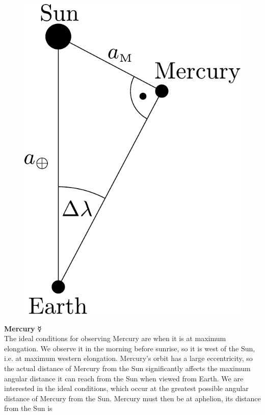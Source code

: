 \documentclass[a4paper,12pt]{extarticle}
\begin{document}
\begin{sol}	
	\begin{figure}
		\centering
		\includegraphics[width=\linewidth]{mercury_pos.pdf}
		\caption{}
		\label{mercury_tri}
	\end{figure}
	
	\textbf{Mercury} $\Mercury$\\
	
The ideal conditions for observing Mercury are when it is at maximum elongation. We observe it in the morning before sunrise, so it is west of the Sun, i.e. at maximum western elongation. Mercury's orbit has a large eccentricity, so the actual distance of Mercury from the Sun significantly affects the maximum angular distance it can reach from the Sun when viewed from Earth. We are interested in the ideal conditions, which occur at the greatest possible angular distance of Mercury from the Sun. Mercury must then be at aphelion, its distance from the Sun is
	

\end{sol}
\end{document}
